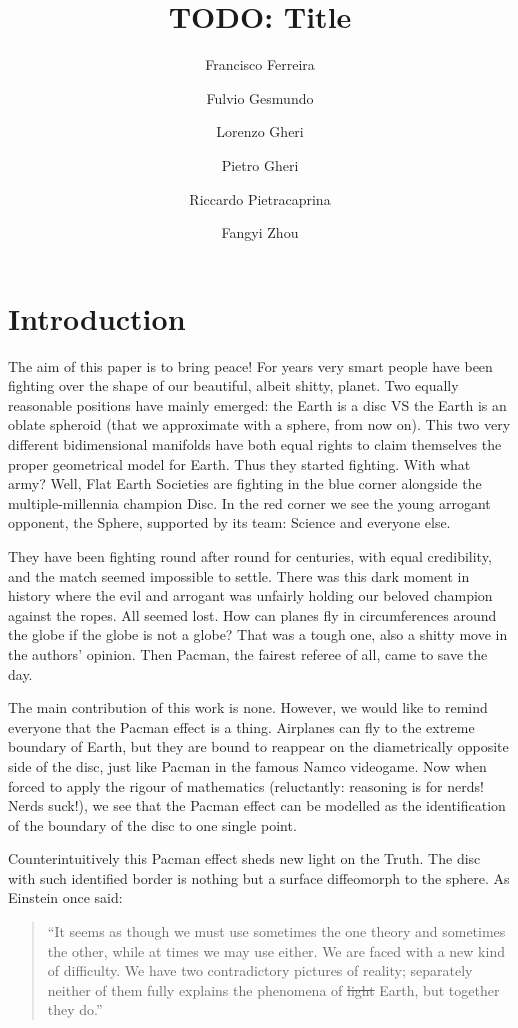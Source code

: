 \documentclass{article}
\title{TODO: Title}
\author{Francisco Ferreira
\and Fulvio Gesmundo \and Lorenzo Gheri \and Pietro Gheri \and  Riccardo Pietracaprina \and Fangyi Zhou }
\date{}
\begin{document}
\maketitle

\section{Introduction}

The aim of this paper is to bring peace! For years very smart people have been
fighting over the shape of our beautiful, albeit shitty, planet. Two equally
reasonable positions have mainly emerged: the Earth is a disc VS the Earth is an oblate spheroid
(that we approximate with a sphere, from now on). This two very different bidimensional manifolds have both equal rights
to claim themselves the proper geometrical model for Earth. Thus they started
fighting. With what army? Well, Flat Earth Societies are fighting in the blue
corner alongside the multiple-millennia champion Disc. In the red corner we see
the young arrogant opponent, the Sphere, supported by its team: Science and
everyone else.

They have been fighting round after round for centuries, with equal
credibility, and the match seemed impossible to settle. There was this dark
moment in history where the evil and arrogant was unfairly holding our beloved
champion against the ropes. All seemed lost. How can planes fly in
circumferences around the globe if the globe is not a globe? That was a tough
one, also a shitty move in the authors' opinion. Then Pacman, the fairest
referee of all, came to save the day.

The main contribution of this work is none. However, we would like to remind
everyone that the Pacman effect is a thing. Airplanes can fly to the extreme
boundary of Earth, but they are bound to reappear on the diametrically opposite
side of the disc, just like Pacman in the famous Namco videogame. Now when
forced to apply the rigour of mathematics (reluctantly: reasoning is for nerds!
Nerds suck!), we see that the Pacman effect can be modelled as the
identification of the boundary of the disc to one single point.

Counterintuitively this Pacman effect sheds new light on the Truth. The disc
with such identified border is nothing but a surface diffeomorph to the sphere.
As Einstein once said:

\begin{quote}
``It seems as though we must use sometimes the one theory and sometimes the
other, while at times we may use either. We are faced with a new kind of
difficulty. We have two contradictory pictures of reality; separately neither
of them fully explains the phenomena of \sout{light} Earth, but together they do.''
\end{quote}
\end{document}
